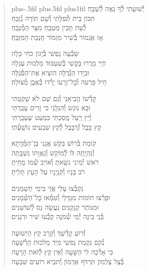 \documentclass[twoside, openany, parskip=half, 11pt]{book}
\begin{document}
\begin{quote}
\leftskip=0pt plus-.5fil
\rightskip=0pt plus.5fil
\parfillskip=0pt plus1fil
יְ֯שׁוּעָתִי \hfill לְ֯ךָ נָאֶה לְ֯שַׁבֵּֽחַ \\ תִּכּוֹן בֵּית תְּ֯פִלָּתִי \hfill וְ֯שָׁם תּוֹדָה נְ֯זַבֵּֽחַ \\
לְ֯עֵת תָּכִין מַטְבֵּֽחַ \hfill מִצָּר הַמְ֯נַבֵּֽחַ \\ אָז אֶגְמוֹר בְּ֯שִׁיר מִזְמוֹר \hfill חֲנֻכַּת הַמִּזְבֵּֽחַ׃

שָׂבְ֯עָה נַפְשִׁי \hfill בְּ֯יָגוֹן כֹּחִי כָּלָה \\ חַיַּי מֵרֲרוּ בָּקֳשִׁי \hfill בְּ֯שִׁעְבּוּד מַלְכוּת עֶגְלָה \\
וּבְיָדוֹ הַגְּ֯דֻלָּה \hfill הוֹצִיא אֶת־הַסְּ֯גֻלָּה \\ חֵיל פַּרְעֹה וְ֯כׇל־זַרְעוֹ \hfill יָרְ֯דוּ כְּ֯אֶֽבֶן מְ֯צוּלָה׃

קָדְ֯שׁוֹ הֱבִיאַֽנִי \hfill וְ֯גַם שָׁם לֹא שָׁקַֽטְתִּי \\ וּבָא נוֹגֵשׂ וְ֯הִגְלַֽנִי \hfill כִּי זָרִים עָבַֽדְתִּי \\
וְ֯יֵין רַֽעַל מָֽסַכְתִּי \hfill כִּמְעַט שֶׁעָבַֽרְתִּי \\ קֵץ בָּבֶל זְ֯רֻבָּבֶל \hfill לְ֯קֵץ שִׁבְעִים נוֹשָֽׁעְ֯תִּי׃

קוֹמַת בְּ֯רוֹשׁ בִּקֵּשׁ \hfill אֲגָגִי בֶּן־הַמְּ֯דָֽתָא \\ וְ֯נִהְיָֽתָה לּוֹ לְ֯מוֹקֵשׁ \hfill וְ֯גַאֲוָתוֹ נִשְׁבָּֽתָה \\
רֹאשׁ יְ֯מִינִי נִשֵּֽׂאתָ \hfill וְ֯אוֹיֵב שְׁ֯מוֹ מָחִֽיתָ \\ רֹב בָּנָיו וְ֯קִנְיָנָיו \hfill עַל הָעֵץ תָּלִֽיתָ׃

נִקְבְּ֯צוּ עָלַי \hfill אֲזַי בִּימֵי חַשְׁמַנִּים \\ וּפָרְ֯צוּ חוֹמוֹת מִגְדָּלַי \hfill וְ֯טִמְּ֯אוּ כׇּל־הַשְּׁ֯מָנִים \\
וּמִנּוֹתַר קַנְקַנִּים \hfill נַעֲשָׂה נֵס לְ֯שׁוֹשַׁנִּים \\ בְּ֯נֵי בִינָה יְ֯מֵי שְׁ֯מֹנָה \hfill קָבְ֯עוּ שִׁיר וּרְנָנִים׃


זְ֯רוֹעַ קָדְ֯שֶׁךָ \hfill וְ֯קָרֵב קֵץ הַיְשׁוּעָה\\
נְ֯קֹם נִקְמַת נַפשִׁי \hfill מִיַּד מַלכוּת הָרְ֯שָׁעָה\\
כִּי אָרְ֯כָה לִי הַשָּׁעָה \hfill וְ֯אֵין קֵץ לְ֯זׂאת הָרָעָה\\
בְּ֯צֵל צַלְמוֹן תִּרְדּׂף אַדְמוֹן \hfill וְ֯תבִיא רוֹעִים שִׁבְעָה

\end{quote}
\end{document}
